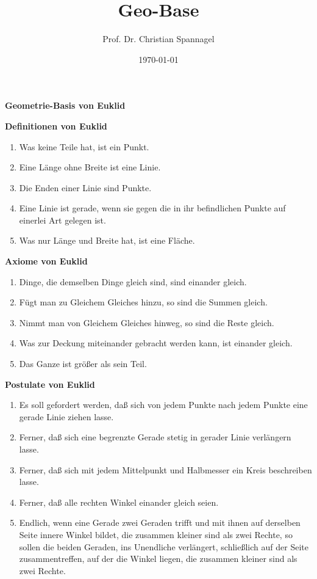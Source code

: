 \documentclass[12pt,a4paper,oneside,ngerman]{article}
\title{Geo-Base}
\author{Prof. Dr. Christian Spannagel}
\date{\today}
\begin{document}
\pagestyle{fancy}
\begin{center}
\vspace*{5mm}
{\LARGE\textbf{Geometrie-Basis von Euklid}}
\end{center}

\textbf{Definitionen von Euklid} 
\begin{enumerate}
\item Was keine Teile hat, ist ein Punkt.
\item Eine Länge ohne Breite ist eine Linie.
\item Die Enden einer Linie sind Punkte.
\item Eine Linie ist gerade, wenn sie gegen die in ihr befindlichen Punkte auf einerlei Art gelegen ist.
\item Was nur Länge und Breite hat, ist eine Fläche.
\end{enumerate}

\textbf{Axiome von Euklid} 
\begin{enumerate}
\item Dinge, die demselben Dinge gleich sind, sind einander gleich.
\item Fügt man zu Gleichem Gleiches hinzu, so sind die Summen gleich.
\item Nimmt man von Gleichem Gleiches hinweg, so sind die Reste gleich.
\item Was zur Deckung miteinander gebracht werden kann, ist einander gleich.
\item Das Ganze ist größer als sein Teil.
\end{enumerate}

\textbf{Postulate von Euklid} 
\begin{enumerate}
\item Es soll gefordert werden, daß sich von jedem Punkte nach jedem Punkte eine gerade Linie ziehen lasse.
\item Ferner, daß sich eine begrenzte Gerade stetig in gerader Linie verlängern lasse.
\item Ferner, daß sich mit jedem Mittelpunkt und Halbmesser ein Kreis beschreiben lasse.
\item Ferner, daß alle rechten Winkel einander gleich seien.
\item Endlich, wenn eine Gerade zwei Geraden trifft und mit ihnen auf derselben Seite innere Winkel bildet, die zusammen kleiner sind als zwei Rechte, so sollen die beiden Geraden, ins Unendliche verlängert, schließlich auf der Seite zusammentreffen, auf der die Winkel liegen, die zusammen kleiner sind als zwei Rechte.
\end{enumerate}
\end{document}
